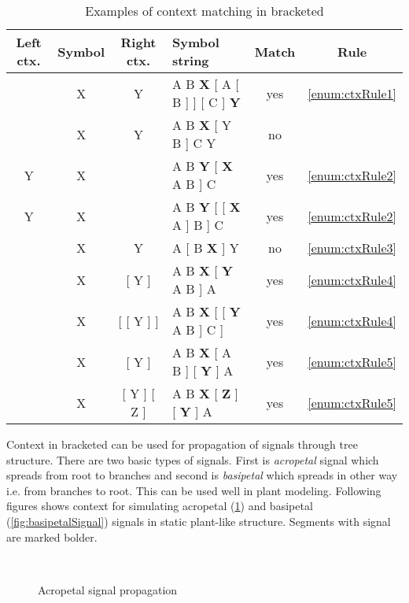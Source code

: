 \begin{table}[ht]
	\centering
	\begin{tabular}{c c c p{128pt} c c}
   		\toprule
   		Left ctx. & Symbol & Right ctx. & Symbol string & Match & Rule\\
   		\midrule
		 & X & Y & A B \textbf{X} [ A [ B ] ] [ C ] \textbf{Y} & yes & \ref{enum:ctxRule1} \\
		 & X & Y & A B \textbf{X} [ Y B ] C Y & no &  \\
		 Y & X & & A B \textbf{Y} [ \textbf{X} A B ] C & yes & \ref{enum:ctxRule2} \\
		 Y & X & & A B \textbf{Y} [ [ \textbf{X} A ] B ] C & yes & \ref{enum:ctxRule2} \\
		 & X & Y & A [ B \textbf{X} ] Y & no & \ref{enum:ctxRule3} \\
		 & X & [ Y ] & A B \textbf{X} [ \textbf{Y} A B ] A  & yes & \ref{enum:ctxRule4} \\
		 & X & [ [ Y ] ] & A B \textbf{X} [ [ \textbf{Y} A B ] C ] & yes & \ref{enum:ctxRule4} \\
		 & X & [ Y ] & A B \textbf{X} [ A B ] [ \textbf{Y} ] A  & yes & \ref{enum:ctxRule5} \\
		 & X & [ Y ] [ Z ] & A B \textbf{X} [ \textbf{Z} ] [ \textbf{Y} ] A  & yes & \ref{enum:ctxRule5} \\
		\bottomrule
	\end{tabular}
	\caption{Examples of context matching in bracketed \lsystems}
	\label{tbl:bracketCtxt}
\end{table}

Context in bracketed \lsystems can be used for propagation of signals through tree structure.
There are two basic types of signals.
First is \emph{acropetal} signal which spreads from root to branches and second is \emph{basipetal} which spreads in other way i.e. from branches to root.
This can be used well in plant modeling.
Following figures shows context \lsystems for simulating acropetal (\ref{fig:acropetalSignal}) and basipetal (\ref{fig:basipetalSignal}) signals in static plant-like structure.
Segments with signal are marked bolder.

\begin{figure}[ht]
	\centering
	 ~
	 ~
	 ~
	 ~
	\caption{Acropetal signal propagation}
	\label{fig:acropetalSignal}
\end{figure}

